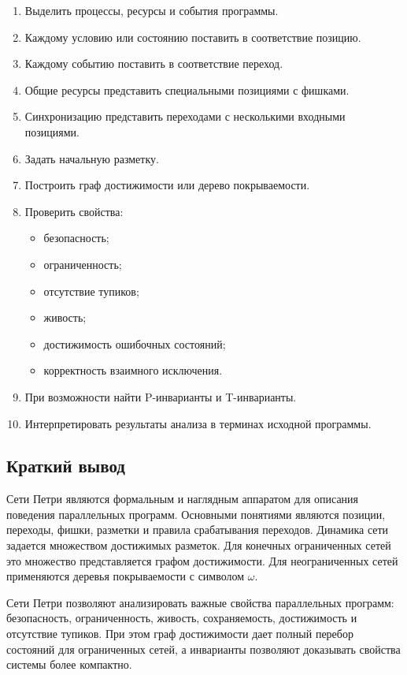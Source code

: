 \documentclass[12pt,a4paper]{article}
\begin{document}
\begin{enumerate}
    \item Выделить процессы, ресурсы и события программы.
    \item Каждому условию или состоянию поставить в соответствие позицию.
    \item Каждому событию поставить в соответствие переход.
    \item Общие ресурсы представить специальными позициями с фишками.
    \item Синхронизацию представить переходами с несколькими входными позициями.
    \item Задать начальную разметку.
    \item Построить граф достижимости или дерево покрываемости.
    \item Проверить свойства:
    \begin{itemize}
        \item безопасность;
        \item ограниченность;
        \item отсутствие тупиков;
        \item живость;
        \item достижимость ошибочных состояний;
        \item корректность взаимного исключения.
    \end{itemize}
    \item При возможности найти P-инварианты и T-инварианты.
    \item Интерпретировать результаты анализа в терминах исходной программы.
\end{enumerate}

\subsection{Краткий вывод}

Сети Петри являются формальным и наглядным аппаратом для описания поведения параллельных программ. Основными понятиями являются позиции, переходы, фишки, разметки и правила срабатывания переходов. Динамика сети задается множеством достижимых разметок. Для конечных ограниченных сетей это множество представляется графом достижимости. Для неограниченных сетей применяются деревья покрываемости с символом $\omega$.

Сети Петри позволяют анализировать важные свойства параллельных программ: безопасность, ограниченность, живость, сохраняемость, достижимость и отсутствие тупиков. При этом граф достижимости дает полный перебор состояний для ограниченных сетей, а инварианты позволяют доказывать свойства системы более компактно.
\end{document}
